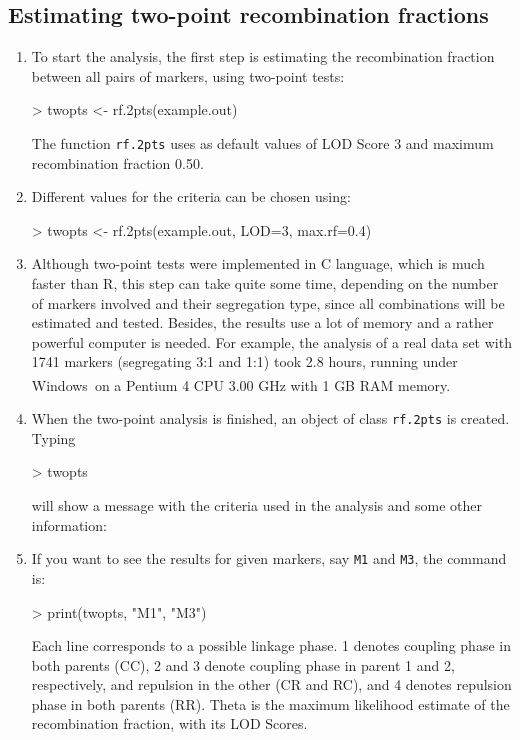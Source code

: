 \documentclass[letterpaper,12pt,oneside]{article}
\begin{document}
\subsection{Estimating two-point recombination fractions}
\begin{enumerate}
\item To start the analysis, the first step is estimating the recombination fraction between all pairs of markers, using two-point tests:
\begin{Schunk}
\begin{Sinput}
> twopts <- rf.2pts(example.out)
\end{Sinput}
\end{Schunk}
The function {\tt rf.2pts} uses as default values of LOD Score 3 and maximum recombination fraction 0.50.

\item Different values for the criteria can be chosen using:
\begin{Schunk}
\begin{Sinput}
> twopts <- rf.2pts(example.out, LOD=3, max.rf=0.4)
\end{Sinput}
\end{Schunk}

\item Although two-point tests were implemented in C language, which is much faster than R, this step can take quite some time, depending on the number of markers involved and their segregation type, since all combinations will be estimated and tested. Besides, the results use a lot of memory and a rather powerful computer is needed. For example, the analysis of a real data set with 1741 markers (segregating 3:1 and 1:1) took 2.8 hours, running under Windows\texttrademark \ on a Pentium\textsuperscript{\textregistered} 4 CPU 3.00 GHz with 1 GB RAM memory.

\item When the two-point analysis is finished, an object of class {\tt rf.2pts} is created. Typing
\begin{Schunk}
\begin{Sinput}
> twopts
\end{Sinput}
\end{Schunk}
will show a message with the criteria used in the analysis and some other information:


\item If you want to see the results for given markers, say {\tt M1} and {\tt M3}, the command is:
\begin{Schunk}
\begin{Sinput}
> print(twopts, "M1", "M3")
\end{Sinput}
\end{Schunk}

Each line corresponds to a possible linkage phase. 1 denotes coupling phase in both parents (CC), 2 and 3 denote coupling phase in parent 1 and 2, respectively, and repulsion in the other (CR and RC), and 4 denotes repulsion phase in both parents (RR). Theta is the maximum likelihood estimate of the recombination fraction, with its LOD Scores.

\end{enumerate}
\end{document}
